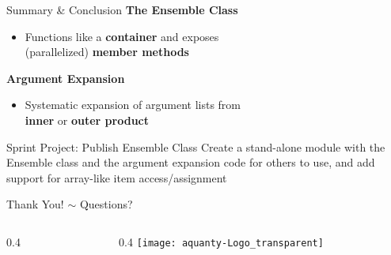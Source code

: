 \documentclass[hyperref={pdfpagelabels=false},compress,final]{beamer}
\newenvironment{myRedBox}[3][upper=upred,lower=lowred,shadow=true]%
{\begin{center} \begin{minipage}{#2} \begin{beamerboxesrounded}[#1]{#3} \smallskip}%
      {\smallskip \end{beamerboxesrounded} \end{minipage} \end{center}}
\begin{document}
\begin{frame}{\hspace*{0.35\textwidth}Summary \& Conclusion}
  \bigskip
  {\Large \color{teal} \textbf{The Ensemble Class} }\smallskip
  \begin{itemize}
    \item Functions like a \textbf{container} and exposes \\(parallelized) \textbf{member methods}
  \end{itemize}
   \medskip
  {\Large {} \textbf{Argument Expansion} }\smallskip
  \begin{itemize}
    \item Systematic expansion of argument lists from \\ \textbf{inner} or \textbf{outer product}
  \end{itemize}
  \medskip
  \begin{myRedBox}{0.9\textwidth}{Sprint Project: Publish Ensemble Class}
    Create a stand-alone module with the Ensemble class and the argument expansion code for others to use, and add support for array-like item access/assignment
  \end{myRedBox}
\end{frame}

\begin{frame}
  \vspace*{0.2\textheight}
  \begin{center}
    \LARGE
    Thank You!\hspace{1.5cm}  $\sim$ \hspace{1.5cm} Questions?
  \end{center}
  \begin{columns}[T]
   \begin{column}{0.4\textwidth}
     \vspace*{0.1\textheight}
   \end{column}
   \begin{column}{0.4\textwidth}
     \vspace*{0.25\textheight}
     \hfill \texttt{[image: aquanty-Logo\_transparent]}
   \end{column}
 \end{columns}
\end{frame}
\end{document}
